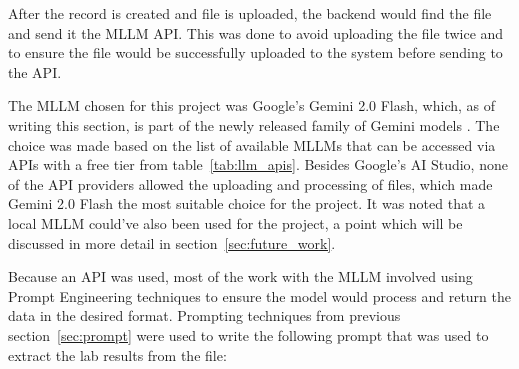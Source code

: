 \FloatBarrier{}

After the record is created and file is uploaded, the backend would find the file and send it the MLLM API\@. This was done to avoid uploading the file twice and to ensure the file would be successfully uploaded to the system before sending to the API\@.

The MLLM chosen for this project was Google's Gemini 2.0 Flash, which, as of writing this section, is part of the newly released family of Gemini models \parencite{gemini2}\@. The choice was made based on the list of available MLLMs that can be accessed via APIs with a free tier from table~\ref{tab:llm_apis}. Besides Google's AI Studio, none of the API providers allowed the uploading and processing of files, which made Gemini 2.0 Flash the most suitable choice for the project. It was noted that a local MLLM could've also been used for the project, a point which will be discussed in more detail in section~\ref{sec:future_work}.

Because an API was used, most of the work with the MLLM involved using Prompt Engineering techniques to ensure the model would process and return the data in the desired format. Prompting techniques from previous section~\ref{sec:prompt} were used to write the following prompt that was used to extract the lab results from the file:

